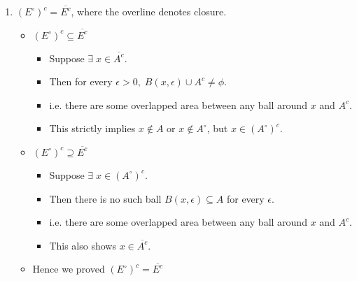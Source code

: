 \documentclass[12pt]{article}
\begin{document}
\begin{enumerate}[label=(\roman*)]
    \item $(E^\circ)^c = \overline{E^c}$, where the overline denotes closure.
        \begin{itemize}
            \item $(E^\circ)^c \subseteq \overline{E^c}$ 
                \begin{itemize}
                    \item Suppose $\exists \; x \in \overline{A^c}$.
                    \item Then for every $\epsilon > 0,\; B(x,\epsilon) \cup A^c \neq \phi.$
                    \item i.e. there are some overlapped area between any ball around $x$ and $A^c$.
                    \item This strictly implies $x \notin A$ or $x \notin A^\circ$, but $x \in (A^\circ)^c$.
                \end{itemize}
                
            \item $(E^\circ)^c \supseteq \overline{E^c}$
                \begin{itemize}
                    \item Suppose $\exists \; x \in (A^\circ)^c$.
                    \item Then there is no such ball $B(x,\epsilon) \subseteq A$ for every $\epsilon$.
                    \item i.e. there are some overlapped area between any ball around $x$ and $A^c$.
                    \item This also shows $x \in \overline{A^c}.$\\
                \end{itemize}
            
            \item Hence we proved $(E^\circ)^c = \overline{E^c}$ 
        \end{itemize}
\end{enumerate}
\end{document}
